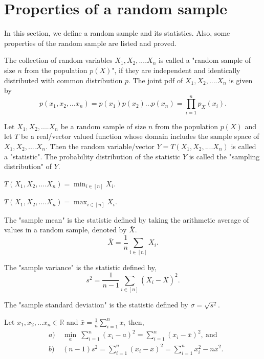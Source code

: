 \documentclass[a4paper,english,12pt]{article}
\begin{document}
\section{Properties of a random sample}
In this section, we define a random sample and its statistics. Also, some properties of the random sample are listed and proved.
\begin{defn}
The collection of random variables $X_1, X_2, .... X_n$ is called a "random sample of size $n$ from the population $p(X)$", if they are independent and identically distributed with common distribution $p$.
The joint pdf of $X_1, X_2, .... X_n$ is given by 
\begin{equation}
p(x_1,x_2,...x_n) = p(x_1) p(x_2)...p(x_n) = \prod\limits_{i=1}^{n} p_X(x_i).
\end{equation} 
\end{defn}
\begin{defn}
Let $X_1, X_2, .... X_n$ be a random sample of size $n$ from the population $p(X)$ and let $T$ be a real/vector valued function whose domain includes the sample space of $X_1, X_2, .... X_n$. Then the random variable/vector $Y = T(X_1, X_2, .... X_n)$ is called a "statistic". The probability distribution of the statistic $Y$ is called the "sampling distribution" of $Y$.
\end{defn}
\begin{exmp}
$T(X_1, X_2, .... X_n) = \min_{i \in [n]} X_i$.
\end{exmp}
\begin{exmp}
$T(X_1, X_2, .... X_n) = \max_{i \in [n]} X_i$.
\end{exmp}
\begin{defn}
The "sample mean" is the statistic defined by taking the arithmetic average of values in a random sample, denoted by $\bar{X}$.
\begin{equation}
\bar{X} = \frac{1}{n} \sum_{i \in [n]} X_i.
\end{equation}
\end{defn}
\begin{defn}
The "sample variance" is the statistic defined by, 
\begin{equation}
s^2 = \frac{1}{n-1}  \sum_{i \in [n]} (X_i - \bar{X})^2.
\end{equation}
\end{defn}
\begin{defn}
The "sample standard deviation" is the statistic defined by $\sigma = \sqrt{s^2}$.
\end{defn}
\begin{thm}
Let $x_1, x_2,...x_n  \in \mathbb{R}$ and $\bar{x} = \frac{1}{n} \displaystyle \sum_{i=1}^{n} x_i$ then,
\begin{eqnarray}
&a)& ~ \min_{a} ~ \sum_{i=1}^{n} (x_i - a)^2 = \sum_{i=1}^{n} (x_i - \bar{x})^2,~\mbox{and} \\
&b)& ~ (n-1)s^2 = \sum_{i=1}^{n} (x_i - \bar{x})^2 = \sum_{i=1}^{n} x_i^2 - n\bar{x}^2.
\end{eqnarray}
\end{thm}
\end{document}
